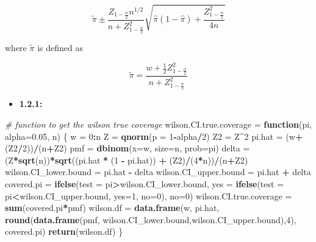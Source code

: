 \documentclass[]{article}
\newenvironment{Shaded}{\begin{snugshade}}{\end{snugshade}}
\newcommand{\CommentTok}[1]{\textcolor[rgb]{0.56,0.35,0.01}{\textit{#1}}}
\newcommand{\ControlFlowTok}[1]{\textcolor[rgb]{0.13,0.29,0.53}{\textbf{#1}}}
\newcommand{\DataTypeTok}[1]{\textcolor[rgb]{0.13,0.29,0.53}{#1}}
\newcommand{\DecValTok}[1]{\textcolor[rgb]{0.00,0.00,0.81}{#1}}
\newcommand{\FloatTok}[1]{\textcolor[rgb]{0.00,0.00,0.81}{#1}}
\newcommand{\KeywordTok}[1]{\textcolor[rgb]{0.13,0.29,0.53}{\textbf{#1}}}
\newcommand{\NormalTok}[1]{#1}
\newcommand{\OperatorTok}[1]{\textcolor[rgb]{0.81,0.36,0.00}{\textbf{#1}}}
\newcommand{\StringTok}[1]{\textcolor[rgb]{0.31,0.60,0.02}{#1}}
\providecommand{\tightlist}{%
  \setlength{\itemsep}{0pt}\setlength{\parskip}{0pt}}
\begin{document}
\[ 
\tilde{\pi} \pm \frac{Z_{1-\frac{\alpha}{2}} n^{1/2}}{n + Z^2_{1-\frac{\alpha}{2}}} \sqrt{\hat{\pi}(1-\hat{\pi}) + \frac{Z^2_{1-\frac{\alpha}{2}}}{4n}}
\]

where \(\tilde{\pi}\) is defined as

\[
\tilde{\pi} = \frac{w + \frac{1}{2}Z^2_{1-\frac{\alpha}{2}}}{n + Z^2_{1-\frac{\alpha}{2}}}
\]

\begin{itemize}
\tightlist
\item
  \textbf{1.2.1:}
\end{itemize}

\begin{Shaded}
\begin{Highlighting}[]
\CommentTok{# function to get the wilson true coverage}
\NormalTok{wilson.CI.true.coverage =}\StringTok{ }\ControlFlowTok{function}\NormalTok{(pi, }\DataTypeTok{alpha=}\FloatTok{0.05}\NormalTok{, n) \{  }
\NormalTok{  w =}\StringTok{ }\DecValTok{0}\OperatorTok{:}\NormalTok{n}
\NormalTok{  Z =}\StringTok{ }\KeywordTok{qnorm}\NormalTok{(}\DataTypeTok{p =} \DecValTok{1}\OperatorTok{-}\NormalTok{alpha}\OperatorTok{/}\DecValTok{2}\NormalTok{)}
\NormalTok{  Z2 =}\StringTok{ }\NormalTok{Z}\OperatorTok{^}\DecValTok{2}
\NormalTok{  pi.hat =}\StringTok{ }\NormalTok{(w}\OperatorTok{+}\NormalTok{(Z2}\OperatorTok{/}\DecValTok{2}\NormalTok{))}\OperatorTok{/}\NormalTok{(n}\OperatorTok{+}\NormalTok{Z2)}
\NormalTok{  pmf =}\StringTok{ }\KeywordTok{dbinom}\NormalTok{(}\DataTypeTok{x=}\NormalTok{w, }\DataTypeTok{size=}\NormalTok{n, }\DataTypeTok{prob=}\NormalTok{pi)}
\NormalTok{  delta =}\StringTok{ }\NormalTok{(Z}\OperatorTok{*}\KeywordTok{sqrt}\NormalTok{(n))}\OperatorTok{*}\KeywordTok{sqrt}\NormalTok{((pi.hat }\OperatorTok{*}\StringTok{ }\NormalTok{(}\DecValTok{1} \OperatorTok{-}\StringTok{ }\NormalTok{pi.hat)) }\OperatorTok{+}\StringTok{ }\NormalTok{(Z2)}\OperatorTok{/}\NormalTok{(}\DecValTok{4}\OperatorTok{*}\NormalTok{n))}\OperatorTok{/}\NormalTok{(n}\OperatorTok{+}\NormalTok{Z2)}
\NormalTok{  wilson.CI_lower.bound =}\StringTok{ }\NormalTok{pi.hat }\OperatorTok{-}\StringTok{ }\NormalTok{delta}
\NormalTok{  wilson.CI_upper.bound =}\StringTok{ }\NormalTok{pi.hat }\OperatorTok{+}\StringTok{ }\NormalTok{delta  }
\NormalTok{  covered.pi =}\StringTok{ }\KeywordTok{ifelse}\NormalTok{(}\DataTypeTok{test =}\NormalTok{ pi}\OperatorTok{>}\NormalTok{wilson.CI_lower.bound, }\DataTypeTok{yes =} \KeywordTok{ifelse}\NormalTok{(}\DataTypeTok{test =}\NormalTok{ pi}\OperatorTok{<}\NormalTok{wilson.CI_upper.bound, }\DataTypeTok{yes=}\DecValTok{1}\NormalTok{, }\DataTypeTok{no=}\DecValTok{0}\NormalTok{), }\DataTypeTok{no=}\DecValTok{0}\NormalTok{)  }
\NormalTok{  wilson.CI.true.coverage =}\StringTok{ }\KeywordTok{sum}\NormalTok{(covered.pi}\OperatorTok{*}\NormalTok{pmf)  }
\NormalTok{  wilson.df =}\StringTok{ }\KeywordTok{data.frame}\NormalTok{(w, pi.hat, }\KeywordTok{round}\NormalTok{(}\KeywordTok{data.frame}\NormalTok{(pmf, wilson.CI_lower.bound,wilson.CI_upper.bound),}\DecValTok{4}\NormalTok{), covered.pi)  }
  \KeywordTok{return}\NormalTok{(wilson.df)}
\NormalTok{\}}
\end{Highlighting}
\end{Shaded}
\end{document}
